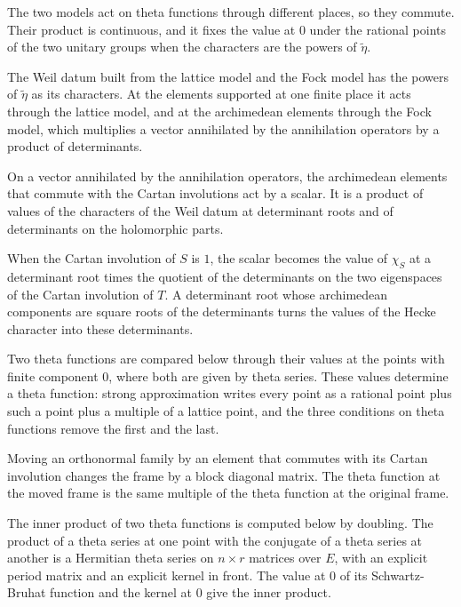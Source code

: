 The two models act on theta functions through different places, so they commute. Their product is continuous, and
it fixes the value at $0$ under the rational points of the two unitary groups when the characters are the powers of
$\tilde\eta$.

The Weil datum built from the lattice model and the Fock model has the powers of $\tilde\eta$ as its
characters. At the elements supported at one finite place it acts through the lattice model, and at the archimedean
elements through the Fock model, which multiplies a vector annihilated by the annihilation operators by a product of
determinants.

On a vector annihilated by the annihilation operators, the archimedean elements that commute with the
Cartan involutions act by a scalar. It is a product of values of the characters of the Weil datum at
determinant roots and of determinants on the holomorphic parts.

When the Cartan involution of $S$ is $1$, the scalar becomes the value of $\chi_S$ at a determinant root
times the quotient of the determinants on the two eigenspaces of the Cartan involution of $T$. A
determinant root whose archimedean components are square roots of the determinants turns the values of the
Hecke character into these determinants.

Two theta functions are compared below through their values at the points with finite component $0$, where
both are given by theta series. These values determine a theta function: strong approximation writes every
point as a rational point plus such a point plus a multiple of a lattice point, and the three conditions
on theta functions remove the first and the last.

Moving an orthonormal family by an element that commutes with its Cartan involution changes the frame by a
block diagonal matrix. The theta function at the moved frame is the same multiple of the theta function at
the original frame.

The inner product of two theta functions is computed below by doubling. The product of a theta series at one point
with the conjugate of a theta series at another is a Hermitian theta series on $n\times r$ matrices over $E$, with
an explicit period matrix and an explicit kernel in front. The value at $0$ of its Schwartz-Bruhat function and the
kernel at $0$ give the inner product.

